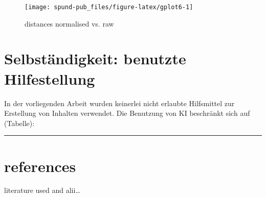 \documentclass[
  12pt,
  oneside]{book}
\begin{document}
\begin{figure}[H]
\texttt{[image: spund-pub\_files/figure-latex/gplot6-1]} \caption{distances normalised vs. raw}\label{fig:gplot6}
\end{figure}

\section{Selbständigkeit: benutzte Hilfestellung}\label{selbstuxe4ndigkeit-benutzte-hilfestellung}

In der vorliegenden Arbeit wurden keinerlei nicht erlaubte Hilfsmittel zur Erstellung von Inhalten verwendet. Die Benutzung von KI beschränkt sich auf (Tabelle):

\begin{table}

\caption{\label{tab:kitable}verwendete Hilfsmittel}
\end{table}

\begin{center}\rule{0.5\linewidth}{0.5pt}\end{center}

\section{references}\label{references}

literature used and alii\ldots{}
\end{document}
